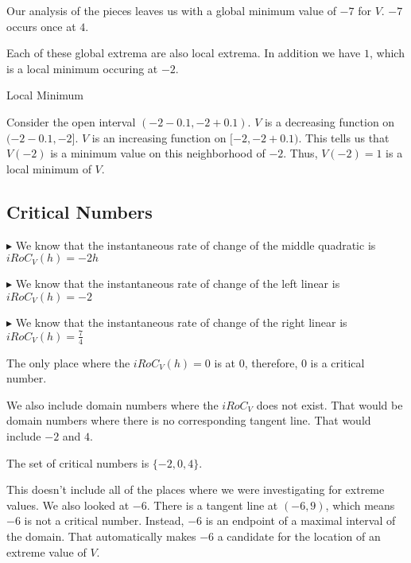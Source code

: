 \documentclass{ximera}
\begin{document}
Our analysis of the pieces leaves us with a global minimum value of $-7$ for $V$. $-7$ occurs once at $4$.



Each of these global extrema are also local extrema.  In addition we have $1$, which is a local minimum occuring at $-2$.  

\begin{explanation} Local Minimum


Consider the open interval $(-2 - 0.1, -2 + 0.1)$. $V$ is a decreasing function on $(-2 - 0.1, -2]$. $V$ is an increasing function on $[-2, -2 + 0.1)$.  This tells us that $V(-2)$ is a minimum value on this neighborhood of $-2$.  Thus, $V(-2) = 1$ is a local minimum of $V$.





\end{explanation}









\subsection*{Critical Numbers} 


$\blacktriangleright$ We know that the instantaneous rate of change of the middle quadratic is $iRoC_V(h) = -2h$ 

$\blacktriangleright$ We know that the instantaneous rate of change of the left linear is $iRoC_V(h) = -2$

$\blacktriangleright$ We know that the instantaneous rate of change of the right linear is $iRoC_V(h) = \frac{7}{4}$



The only place where the $iRoC_V(h) = 0$ is at $0$, therefore, $0$ is a critical number.


We also include domain numbers where the $iRoC_V$ does not exist.  That would be domain numbers where there is no corresponding tangent line.  That would include $-2$ and $4$.



The set of critical numbers is $\{ -2, 0, 4 \}$.




This doesn't include all of the places where we were investigating for extreme values. We also looked at $-6$.  There is a tangent line at $(-6, 9)$, which means $-6$ is not a critical number. Instead, $-6$ is an endpoint of a maximal interval of the domain. That automatically makes $-6$ a candidate for the location of an extreme value of $V$. \\
\end{document}
